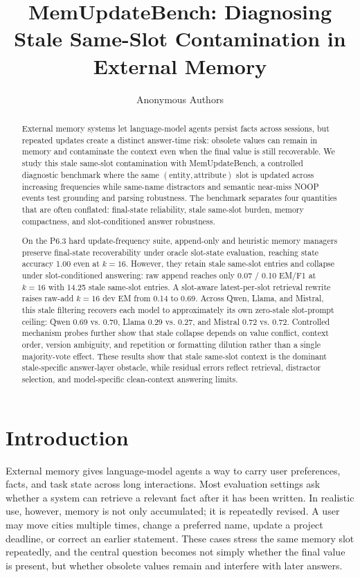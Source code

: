 \documentclass[11pt]{article}
\title{MemUpdateBench: Diagnosing Stale Same-Slot Contamination in External Memory}
\author{Anonymous Authors}
\date{}
\begin{document}
\maketitle

\begin{abstract}
External memory systems let language-model agents persist facts across sessions, but repeated updates create a distinct answer-time risk: obsolete values can remain in memory and contaminate the context even when the final value is still recoverable. We study this stale same-slot contamination with MemUpdateBench, a controlled diagnostic benchmark where the same \((\mathrm{entity}, \mathrm{attribute})\) slot is updated across increasing frequencies while same-name distractors and semantic near-miss NOOP events test grounding and parsing robustness. The benchmark separates four quantities that are often conflated: final-state reliability, stale same-slot burden, memory compactness, and slot-conditioned answer robustness.

On the P6.3 hard update-frequency suite, append-only and heuristic memory managers preserve final-state recoverability under oracle slot-state evaluation, reaching state accuracy 1.00 even at \(k=16\). However, they retain stale same-slot entries and collapse under slot-conditioned answering: raw append reaches only 0.07 / 0.10 EM/F1 at \(k=16\) with 14.25 stale same-slot entries. A slot-aware latest-per-slot retrieval rewrite raises raw-add \(k=16\) dev EM from 0.14 to 0.69. Across Qwen, Llama, and Mistral, this stale filtering recovers each model to approximately its own zero-stale slot-prompt ceiling: Qwen 0.69 vs. 0.70, Llama 0.29 vs. 0.27, and Mistral 0.72 vs. 0.72. Controlled mechanism probes further show that stale collapse depends on value conflict, context order, version ambiguity, and repetition or formatting dilution rather than a single majority-vote effect. These results show that stale same-slot context is the dominant stale-specific answer-layer obstacle, while residual errors reflect retrieval, distractor selection, and model-specific clean-context answering limits.
\end{abstract}

\section{Introduction}

External memory gives language-model agents a way to carry user preferences, facts, and task state across long interactions. Most evaluation settings ask whether a system can retrieve a relevant fact after it has been written. In realistic use, however, memory is not only accumulated; it is repeatedly revised. A user may move cities multiple times, change a preferred name, update a project deadline, or correct an earlier statement. These cases stress the same memory slot repeatedly, and the central question becomes not simply whether the final value is present, but whether obsolete values remain and interfere with later answers.
\end{document}
